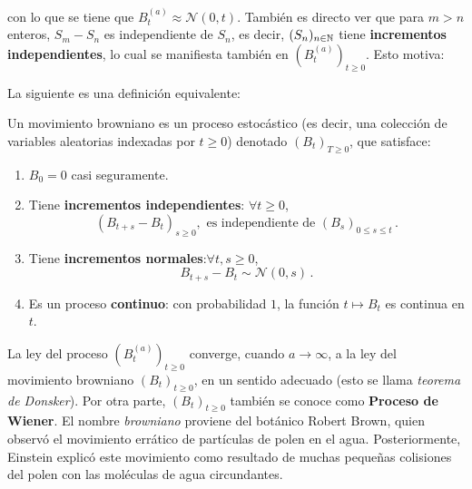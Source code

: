 con lo que se tiene que $B_t^{(a)} \approx \mathcal{N}(0,t)$. También es directo ver que para $m > n$ enteros, $S_m - S_n$ es independiente de $S_n$, es decir, $(S_n)_{n \in \mathbb{N}}$ tiene \textbf{incrementos independientes}, lo cual se manifiesta también en $(B_{t}^{(a)})_{t \geq 0}$. Esto motiva:
\fi

La siguiente es una definición equivalente:
\begin{definition}
        \label{def:mb}
        Un movimiento browniano es un proceso estocástico (es decir, una colección de variables aleatorias indexadas por $t \geq 0$) denotado $(B_t)_{T \geq 0}$, que satisface:     
\renewcommand{\labelenumi}{\roman{enumi})}
\begin{enumerate}
    \item $B_0 = 0$ casi seguramente.
    \item Tiene \textbf{incrementos independientes}: $\forall  t\geq 0$,
        \begin{equation*}
                (B_{t+s} - B_t)_{s \geq 0}, \text{ es independiente de } (B_{s})_{0 \leq s \leq t}\,.
        \end{equation*}
    \item Tiene \textbf{incrementos normales}:\espacio $\forall  t,s \geq 0$,
        \begin{equation*}
                B_{t+s} - B_t \sim \mathcal{N}(0,s)\,.
        \end{equation*}
    \item Es un proceso \textbf{continuo}: con probabilidad $1$, la función $t \mapsto B_t$ es continua en $t$.
\end{enumerate}
\end{definition}


La ley del proceso $(B_{t}^{(a)})_{t \geq 0}$ converge, cuando $a \rightarrow \infty$, a la ley del movimiento browniano $(B_t)_{t \geq 0}$, en un sentido adecuado (esto se llama \textit{teorema de Donsker}). Por otra parte, $(B_t)_{t \geq 0}$ también se conoce como \textbf{Proceso de Wiener}. El nombre \textit{browniano} proviene del botánico Robert Brown, quien observó el movimiento errático de partículas de polen en el agua. Posteriormente, Einstein explicó este movimiento como resultado de muchas pequeñas colisiones del polen con las moléculas de agua circundantes.
\iffalse
\newp Dado lo anterior surge la pregunta: ¿ Existe un proceso cumpliendo las condiciones de la definición anterior?
\begin{theorem}
    \label{teo:mb}
    El movimiento browniano existe.
\end{theorem}
La demostración queda pendiente. Por ahora veamos algunas propiedades básicas del movimiento browniano.
\fi

